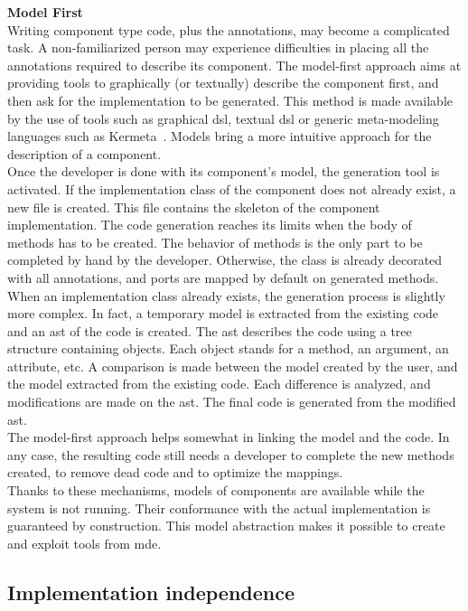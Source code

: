 {\bf Model First}\\
Writing component type code, plus the annotations, may become a complicated task. A non-familiarized person may experience difficulties in placing all the annotations required to describe its component.
The model-first approach aims at providing tools to graphically (or textually) describe the component first, and then ask for the implementation to be generated. This method is made available by the use of tools such as graphical \gls{dsl}, textual \gls{dsl} or generic meta-modeling languages such as Kermeta~\cite{Muller05a}. Models bring a more intuitive approach for the description of a component.\\ 
Once the developer is done with its component's model, the generation tool is activated. If the implementation class of the component does not already exist, a new file is created. This file contains the skeleton of the component implementation. The code generation reaches its limits when the body of methods has to be created. The behavior of methods is the only part to be completed by hand by the developer. Otherwise, the class is already decorated with all annotations, and ports are mapped by default on generated methods.\\
When an implementation class already exists, the generation process is slightly more complex. In fact, a temporary model is extracted from the existing code and an \gls{ast} of the code is created. The \gls{ast} describes the code using a tree structure containing objects. Each object stands for a method, an argument, an attribute, etc. A comparison is made between the model created by the user, and the model extracted from the existing code. Each difference is analyzed, and modifications are made on the \gls{ast}. The final code is generated from the modified \gls{ast}.\\
The model-first approach helps somewhat in linking the model and the code. In any case, the resulting code still needs a developer to complete the new methods created, to remove dead code and to optimize the mappings.\\

Thanks to these mechanisms, models of components are available while the system is not running. Their conformance with the actual implementation is guaranteed by construction. This model abstraction makes it possible to create and exploit tools from \gls{mde}.\\


\subsection{Implementation independence}
\label{subsec:compImplIndep}

